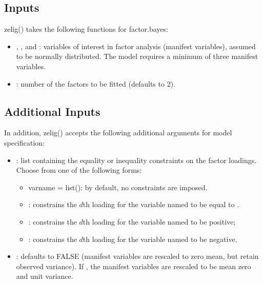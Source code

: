 \documentclass[letterpaper,10pt,english]{sphinxmanual}
\begin{document}
\subsection{Inputs}
\label{vignette:id68}
zelig() takes the following functions for factor.bayes:
\begin{itemize}
\item {} 
, , and : variables of interest in factor analysis
(manifest variables), assumed to be normally distributed. The model
requires a minimum of three manifest variables.

\item {} 
: number of the factors to be fitted (defaults to 2).

\end{itemize}


\subsection{Additional Inputs}
\label{vignette:additional-inputs}
In addition, zelig() accepts the following additional arguments for
model specification:
\begin{itemize}
\item {} 
: list containing the equality or inequality
constraints on the factor loadings. Choose from one of the following
forms:
\begin{itemize}
\item {} 
varname = list(): by default, no constraints are imposed.

\item {} 
: constrains the \(d\)th loading for
the variable named  to be equal to .

\item {} 
: constrains the \(d\)th loading for
the variable named  to be positive;

\item {} 
: constrains the \(d\)th loading for
the variable named  to be negative.

\end{itemize}

\item {} 
: defaults to FALSE (manifest variables are rescaled to
zero mean, but retain observed variance). If , the manifest
variables are rescaled to be mean zero and unit variance.

\end{itemize}
\end{document}
